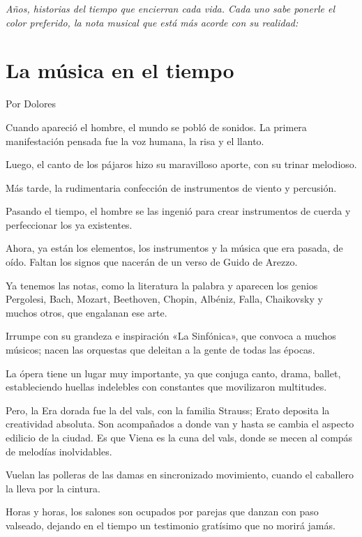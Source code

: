 \documentclass[11pt,twoside,openright,a5paper]{book}
\begin{document}
\vspace{0.5cm}
\emph{Años, historias del tiempo que encierran cada vida. Cada uno sabe ponerle el color preferido, la nota musical que está más acorde con su realidad:}

\section*{La música en el tiempo}

\begin{flushright}Por Dolores\end{flushright}

Cuando apareció el hombre, el mundo se pobló de sonidos. La primera manifestación pensada fue la voz humana, la risa y el llanto.

Luego, el canto de los pájaros hizo su maravilloso aporte, con su trinar melodioso.

Más tarde, la rudimentaria confección de instrumentos de viento y percusión.

Pasando el tiempo, el hombre se las ingenió para crear instrumentos de cuerda y perfeccionar los ya existentes.

Ahora, ya están los elementos, los instrumentos y la música que era pasada, de oído. Faltan los signos que nacerán de un verso de Guido de Arezzo.

Ya tenemos las notas, como la literatura la palabra y aparecen los genios Pergolesi, Bach, Mozart, Beethoven, Chopin, Albéniz, Falla, Chaikovsky y muchos otros, que engalanan ese arte.

Irrumpe con su grandeza e inspiración «La Sinfónica», que convoca a muchos músicos; nacen las orquestas que deleitan a la gente de todas las épocas.

La ópera tiene un lugar muy importante, ya que conjuga canto, drama, ballet, estableciendo huellas indelebles con constantes que movilizaron multitudes.

Pero, la Era dorada fue la del vals, con la familia Strauss; Erato deposita la creatividad absoluta. Son acompañados a donde van y hasta se cambia el aspecto edilicio de la ciudad. Es que Viena es la cuna del vals, donde se mecen al compás de melodías inolvidables.

Vuelan las polleras de las damas en sincronizado movimiento, cuando el caballero la lleva por la cintura.

Horas y horas, los salones son ocupados por parejas que danzan con paso valseado, dejando en el tiempo un testimonio gratísimo que no morirá jamás.
\end{document}
